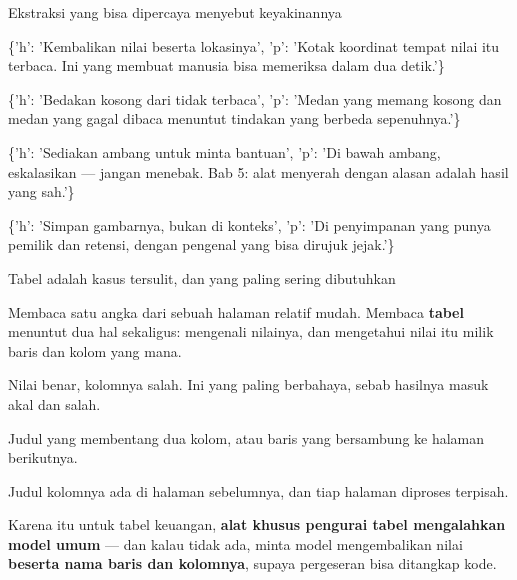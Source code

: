 \documentclass[aspectratio=169,11pt,t]{beamer}
\begin{document}
\begin{frame}[shrink=25]{Ekstraksi yang bisa dipercaya menyebut keyakinannya}
\begin{isteps}
\item \{'h': 'Kembalikan nilai beserta lokasinya', 'p': 'Kotak koordinat tempat nilai itu terbaca. Ini yang membuat manusia bisa memeriksa dalam dua detik.'\}
\item \{'h': 'Bedakan kosong dari tidak terbaca', 'p': 'Medan yang memang kosong dan medan yang gagal dibaca menuntut tindakan yang berbeda sepenuhnya.'\}
\item \{'h': 'Sediakan ambang untuk minta bantuan', 'p': 'Di bawah ambang, eskalasikan --- jangan menebak. Bab 5: alat menyerah dengan alasan adalah hasil yang sah.'\}
\item \{'h': 'Simpan gambarnya, bukan di konteks', 'p': 'Di penyimpanan yang punya pemilik dan retensi, dengan pengenal yang bisa dirujuk jejak.'\}
\end{isteps}
\end{frame}

\begin{frame}[shrink=25]{Tabel adalah kasus tersulit, dan yang paling sering dibutuhkan}
{\fontsize{9.4}{12.6}\selectfont\color{fg2}Membaca satu angka dari sebuah halaman relatif mudah. Membaca \textbf{tabel} menuntut dua hal sekaligus: mengenali nilainya, dan mengetahui nilai itu milik baris dan kolom yang mana.\par}\vskip 4pt
\begin{minipage}[t]{0.3253\textwidth}
\begin{icardbad}
Nilai benar, kolomnya salah. Ini yang paling berbahaya, sebab hasilnya masuk akal dan salah.
\end{icardbad}
\end{minipage}%
\hfill
\begin{minipage}[t]{0.3253\textwidth}
\begin{icard}
Judul yang membentang dua kolom, atau baris yang bersambung ke halaman berikutnya.
\end{icard}
\end{minipage}%
\hfill
\begin{minipage}[t]{0.3253\textwidth}
\begin{icard}
Judul kolomnya ada di halaman sebelumnya, dan tiap halaman diproses terpisah.
\end{icard}
\end{minipage}%
\begin{iband}[signal]
Karena itu untuk tabel keuangan, \textbf{alat khusus pengurai tabel mengalahkan model umum} --- dan kalau tidak ada, minta model mengembalikan nilai \textbf{beserta nama baris dan kolomnya}, supaya pergeseran bisa ditangkap kode.
\end{iband}
\end{frame}
\end{document}
